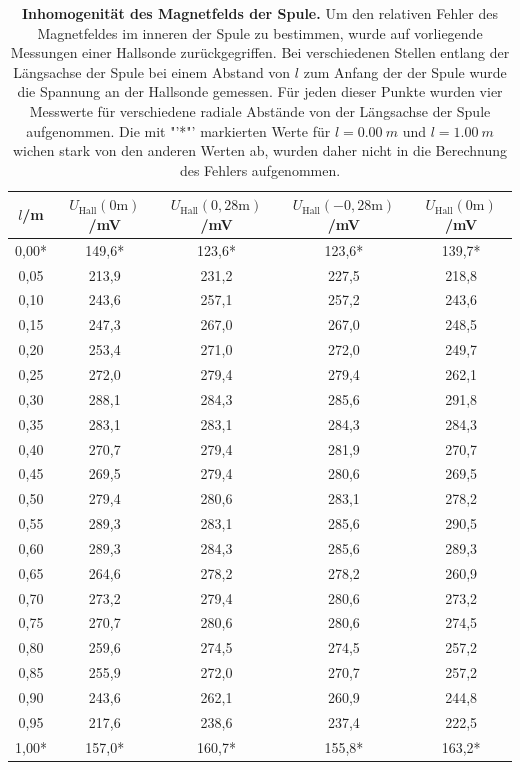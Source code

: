 \documentclass[a4paper,ngerman]{scrartcl}
\begin{document}
\begin{table}[tb!]
\centering
\caption[Inhomogenität des Magnetfelds der Spule]{\textbf{Inhomogenität des Magnetfelds der Spule.} 
Um den relativen Fehler des Magnetfeldes im inneren der Spule zu bestimmen, wurde auf vorliegende Messungen einer Hallsonde zurückgegriffen.
Bei verschiedenen Stellen entlang der Längsachse der Spule bei einem Abstand von $l$ zum Anfang der der Spule 
wurde die Spannung an der Hallsonde gemessen.
Für jeden dieser Punkte wurden vier Messwerte für verschiedene radiale Abstände von der Längsachse der Spule aufgenommen.
Die mit "'*"' markierten Werte für $l = \SI{0.00}{m}$ und $l = \SI{1.00}{m}$ wichen stark von den anderen Werten ab,
wurden daher nicht in die Berechnung des Fehlers aufgenommen.}
\begin{tabular}{ccccc}
\toprule 
$l$/m	&	$U_{\mathrm{Hall}} (0 \mathrm{m})$/mV	&	$U_{\mathrm{Hall}} (0,28 \mathrm{m})$/mV	&	$U_{\mathrm{Hall}}(- 0,28 \mathrm{m})$/mV	&	$U_{\mathrm{Hall}} (0 \mathrm{m})$/mV	\\
\midrule
0,00* & 149,6* & 123,6* & 123,6* & 139,7* \\
0,05 & 213,9 & 231,2 & 227,5 & 218,8 \\
0,10 & 243,6 & 257,1 & 257,2 & 243,6 \\
0,15 & 247,3 & 267,0 & 267,0 & 248,5 \\
0,20 & 253,4 & 271,0 & 272,0 & 249,7 \\
0,25 & 272,0 & 279,4 & 279,4 & 262,1 \\
0,30 & 288,1 & 284,3 & 285,6 & 291,8 \\
0,35 & 283,1 & 283,1 & 284,3 & 284,3 \\
0,40 & 270,7 & 279,4 & 281,9 & 270,7 \\
0,45 & 269,5 & 279,4 & 280,6 & 269,5 \\
0,50 & 279,4 & 280,6 & 283,1 & 278,2 \\
0,55 & 289,3 & 283,1 & 285,6 & 290,5 \\
0,60 & 289,3 & 284,3 & 285,6 & 289,3 \\
0,65 & 264,6 & 278,2 & 278,2 & 260,9 \\
0,70 & 273,2 & 279,4 & 280,6 & 273,2 \\
0,75 & 270,7 & 280,6 & 280,6 & 274,5 \\
0,80 & 259,6 & 274,5 & 274,5 & 257,2 \\
0,85 & 255,9 & 272,0 & 270,7 & 257,2 \\
0,90 & 243,6 & 262,1 & 260,9 & 244,8 \\
0,95 & 217,6 & 238,6 & 237,4 & 222,5 \\
1,00* & 157,0* & 160,7* & 155,8* & 163,2* \\
\bottomrule
\end{tabular}
\label{tab:fieldinhomogenities}
\end{table}
\end{document}
